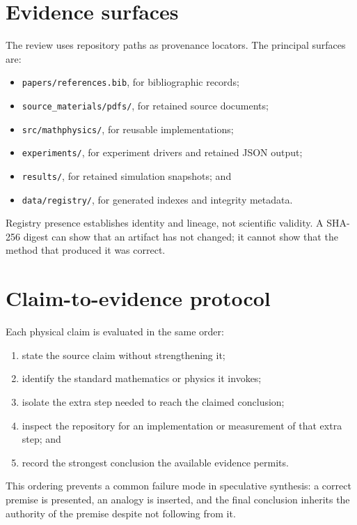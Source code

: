 \section{Evidence surfaces}

The review uses repository paths as provenance locators. The principal
surfaces are:

\begin{itemize}
  \item \texttt{papers/references.bib}, for bibliographic records;
  \item \texttt{source\_materials/pdfs/}, for retained source documents;
  \item \texttt{src/mathphysics/}, for reusable implementations;
  \item \texttt{experiments/}, for experiment drivers and retained JSON output;
  \item \texttt{results/}, for retained simulation snapshots; and
  \item \texttt{data/registry/}, for generated indexes and integrity metadata.
\end{itemize}

Registry presence establishes identity and lineage, not scientific validity.
A SHA-256 digest can show that an artifact has not changed; it cannot show that
the method that produced it was correct.

\section{Claim-to-evidence protocol}

Each physical claim is evaluated in the same order:

\begin{enumerate}
  \item state the source claim without strengthening it;
  \item identify the standard mathematics or physics it invokes;
  \item isolate the extra step needed to reach the claimed conclusion;
  \item inspect the repository for an implementation or measurement of that
    extra step; and
  \item record the strongest conclusion the available evidence permits.
\end{enumerate}

This ordering prevents a common failure mode in speculative synthesis: a
correct premise is presented, an analogy is inserted, and the final conclusion
inherits the authority of the premise despite not following from it.

